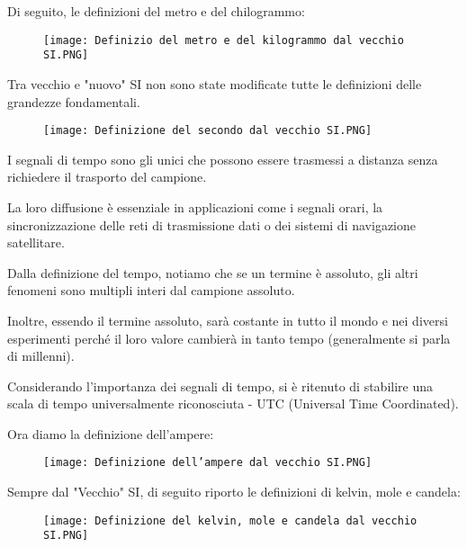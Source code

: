 Di seguito, le definizioni del metro e del chilogrammo: 

\begin{figure}[h]
    \centering
    \texttt{[image: Definizio del metro e del kilogrammo dal vecchio SI.PNG]}
\end{figure}

Tra vecchio e "nuovo" SI non sono state modificate tutte le definizioni delle grandezze fondamentali. \newline 

\begin{figure}[h]
    \centering
    \texttt{[image: Definizione del secondo dal vecchio SI.PNG]}
\end{figure}

I segnali di tempo sono gli unici che possono essere trasmessi a distanza senza richiedere il trasporto del campione. \newline 

La loro diffusione è essenziale in applicazioni come i segnali orari, la sincronizzazione delle reti di trasmissione dati o dei sistemi di navigazione satellitare. \newline 

Dalla definizione del tempo, notiamo che se un termine è assoluto, gli altri fenomeni sono multipli interi dal campione assoluto. \newline 

Inoltre, essendo il termine assoluto, sarà costante in tutto il mondo e nei diversi esperimenti perché il loro valore cambierà in tanto tempo (generalmente si parla di millenni). \newline 

Considerando l'importanza dei segnali di tempo, si è ritenuto di stabilire una scala di tempo universalmente riconosciuta - UTC (Universal Time Coordinated). \newline 

Ora diamo la definizione dell'ampere: 

\begin{figure}[h]
    \centering
    \texttt{[image: Definizione dell'ampere dal vecchio SI.PNG]}
\end{figure}

\newpage

Sempre dal "Vecchio" SI, di seguito riporto le definizioni di kelvin, mole e candela: 

\begin{figure}[h]
    \centering
    \texttt{[image: Definizione del kelvin, mole e candela dal vecchio SI.PNG]}
\end{figure}


